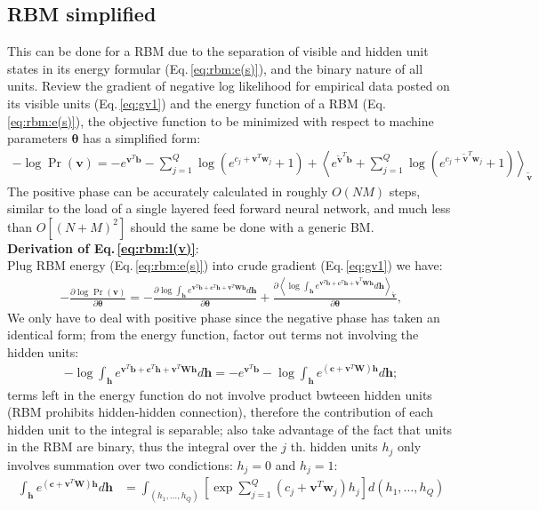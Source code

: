 \documentclass[11pt]{article}
\newcommand{\mean}[2]{\left\langle{#1}\right\rangle_{#2}}
\newcommand{\vb}{\boldsymbol{b}}
\newcommand{\vc}{\boldsymbol{c}}
\newcommand{\vh}{\boldsymbol{h}}
\newcommand{\vv}{\boldsymbol{v}}
\newcommand{\vw}{\boldsymbol{w}}
\newcommand{\mw}{\boldsymbol{W}}
\newcommand{\vbt}{\tilde{\vb}}
\newcommand{\vvt}{\tilde{\vv}}
\newcommand{\pEC}{\boldsymbol{\theta}}
\newcommand{\PDV}[2]{\frac{\partial #1}{\partial #2}}
\begin{document}
{\subsection{RBM simplified}
This can be done for a RBM due to the separation of visible and hidden unit states in its energy formular (Eq.\,\ref{eq:rbm:e(s)}), and the binary nature of all units. Review the gradient of negative log likelihood for empirical data posted on its visible units (Eq.\,\ref{eq:gv1}) and the energy function of a RBM (Eq.\,\ref{eq:rbm:e(s)}), the objective function to be minimized with respect to machine parameters $\pEC$ has a simplified form:
\begin{align}\label{eq:rbm:l(v)}
  -\log{\Pr(\vv)} = -e^{\vv^T\vb} - \sum_{j=1}^Q{\log{(e^{c_j + \vv^T\vw_j}+1)}} + \mean{e^{\vvt^T\vb} + \sum_{j=1}^Q{\log{(e^{c_j + \vvt^T\vw_j}+1)}}}{\vvt}
\end{align}
The positive phase can be accurately calculated in roughly $O(NM)$ steps, similar to the load of a single layered feed forward neural network, and much less than $O[(N+M)^2]$ should the same be done with a generic BM.\\
\textbf{Derivation of Eq.\,{\eqref{eq:rbm:l(v)}}}: \\
Plug RBM energy (Eq.\,\ref{eq:rbm:e(s)}) into crude gradient (Eq.\,\ref{eq:gv1}) we have:
\begin{align*}
  -\PDV{\log{\Pr(\vv)}}{\pEC} = -\PDV{\log{\int_{\vh}{e^{\vv^T\vb + \vc^T\vh + \vv^T\mw\vh}d\vh}}}{\pEC} + \PDV{\mean{\log{\int_{\vh}{e^{\vv^T\vbt + \vc^T\vh + \vvt^T\mw\vh}d\vh}}}{\vvt}}{\pEC},
\end{align*}
We only have to deal with positive phase since the negative phase has taken an identical form; from the energy function, factor out terms not involving the hidden units:
\begin{align*}
  -\log{\int_{\vh}{e^{\vv^T\vb + \vc^T\vh + \vv^T\mw\vh}} d\vh} = -e^{\vv^T\vb} - \log{\int_{\vh}{e^{(\vc + \vv^T\mw)\vh}} d\vh};
\end{align*}
terms left in the energy function do not involve product bwteeen hidden units (RBM prohibits hidden-hidden connection), therefore the contribution of each hidden unit to the integral is separable; also take advantage of the fact that units in the RBM are binary, thus the integral over the $j$ th. hidden units $h_j$ only involves summation over two condictions: $h_j=0$ and $h_j=1$:
\begin{align*}
  \int_{\vh}{e^{(\vc + \vv^T\mw)\vh}} d\vh
  & = \int_{(h_1, \dots, h_Q)} \left[\exp{\sum_{j=1}^Q{(c_j + \vv^T\vw_j)h_j}} \right] d(h_1, \dots, h_Q) \\

\end{align*}}
\end{document}
